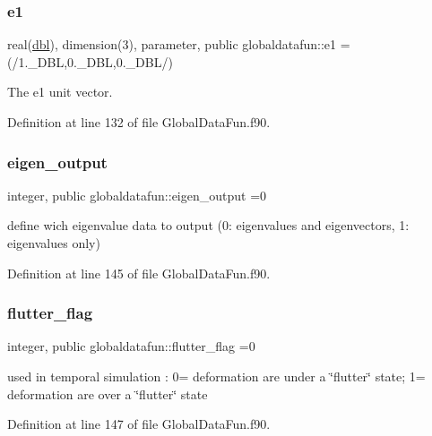 \subsubsection{\texorpdfstring{e1}{e1}}
{\footnotesize\ttfamily real(\hyperlink{namespaceglobaldatafun_a5008801201dd34f2af8eae07756befb4}{dbl}), dimension(3), parameter, public globaldatafun\+::e1 =(/1.\+\_\+\+D\+BL,0.\+\_\+\+D\+BL,0.\+\_\+\+D\+BL/)}



The e1 unit vector. 



Definition at line 132 of file Global\+Data\+Fun.\+f90.

\mbox{\label{namespaceglobaldatafun_a312b192a05c2e5b3dd301528abdba07c}} 
\subsubsection{\texorpdfstring{eigen\+\_\+output}{eigen\_output}}
{\footnotesize\ttfamily integer, public globaldatafun\+::eigen\+\_\+output =0}



define wich eigenvalue data to output (0\+: eigenvalues and eigenvectors, 1\+: eigenvalues only) 



Definition at line 145 of file Global\+Data\+Fun.\+f90.

\mbox{\label{namespaceglobaldatafun_a71be24aec97056093e319698ed6df6fd}} 
\subsubsection{\texorpdfstring{flutter\+\_\+flag}{flutter\_flag}}
{\footnotesize\ttfamily integer, public globaldatafun\+::flutter\+\_\+flag =0}



used in temporal simulation \+: 0= deformation are under a \char`\"{}flutter\char`\"{} state; 1= deformation are over a \char`\"{}flutter\char`\"{} state 



Definition at line 147 of file Global\+Data\+Fun.\+f90.

